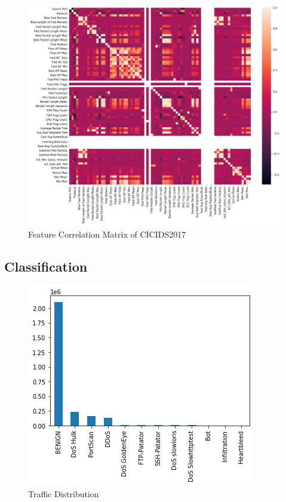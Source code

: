 \textcolor{dimgray}{\lipsum[1]}

\begin{figure}[h!]
    \centering
    \includegraphics[scale=0.5]{assets/figures/chapter3/feature-correlation.png}
    \caption{Feature Correlation Matrix of CICIDS2017}
    \label{fig:feature-correlation}
\end{figure}


\subsection{Classification}
\label{subsec:classification}

\textcolor{dimgray}{\lipsum[1]}

\begin{figure}[h!]
    \centering
    \includegraphics[scale=0.6]{assets/figures/chapter3/traffic_distribution.png}
    \caption{Traffic Distribution}
    \label{fig:traffic-distribution}
\end{figure}

